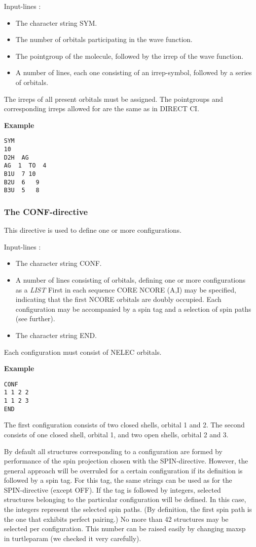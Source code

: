 \documentclass[11pt,fleqn]{article}
\begin{document}
Input-lines :
\begin{itemize}
\item The character string SYM.
\item The number of orbitals participating in the wave function.
\item The pointgroup of the molecule, followed by the irrep of the wave function.
\item A number of lines, each one consisting of an irrep-symbol, followed by a series of orbitals.
\end{itemize}

The irreps of all present orbitals must be assigned. 
The pointgroups and corresponding irreps allowed for are the same as in 
DIRECT CI. 

{\bf Example  }
\begin{verbatim} 
SYM
10
D2H  AG
AG  1  TO  4
B1U  7 10
B2U  6   9
B3U  5   8
\end{verbatim}

\subsubsection{The CONF-directive}

This directive is used to define one or more configurations.

Input-lines :
\begin{itemize}

\item The character string CONF. 
\item A number of lines consisting of orbitals, defining one or more configurations as a \textit{LIST}
First in each sequence  CORE NCORE (A,I)
may be specified, indicating that the first NCORE orbitals are doubly occupied.
Each configuration may be accompanied by a spin tag and a selection of spin paths 
(see further).
\item The character string END.
\end{itemize}

Each configuration must consist of NELEC orbitals.

{\bf Example }
\begin{verbatim}
CONF
1 1 2 2
1 1 2 3
END
\end{verbatim}

The first configuration consists of two closed shells, orbital 1 and 2. 
The second consists of one closed shell, orbital 1, and two open shells, 
orbital 2 and 3.

By default all structures corresponding to a configuration are formed 
by performance of the spin projection chosen with the SPIN-directive. 
However, the general approach will be overruled for a certain configuration 
if its definition is followed by a spin tag. For this tag, the same strings 
can be used as for the SPIN-directive (except OFF). If the tag is followed 
by integers, selected structures belonging to the particular configuration 
will be defined. In this case, the integers represent the selected spin paths. 
(By definition, the first spin path is the one that exhibits perfect pairing.) 
No more than 42 structures may be selected per configuration.
This number can be raised easily by changing maxsp in  turtleparam (we checked it very carefully).
\end{document}
